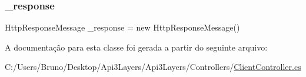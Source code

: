 \subsubsection{\texorpdfstring{\+\_\+response}{\_response}}
{\footnotesize\ttfamily Http\+Response\+Message \+\_\+response = new Http\+Response\+Message()\hspace{0.3cm}{\ttfamily [private]}}



A documentação para esta classe foi gerada a partir do seguinte arquivo\+:\begin{DoxyCompactItemize}
\item 
C\+:/\+Users/\+Bruno/\+Desktop/\+Api3\+Layers/\+Api3\+Layers/\+Controllers/\hyperlink{ClientController_8cs}{Client\+Controller.\+cs}\end{DoxyCompactItemize}
